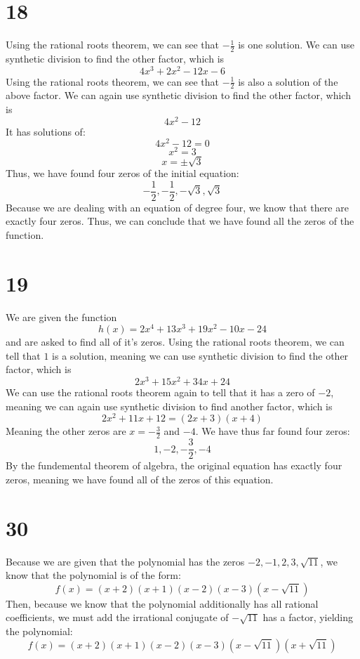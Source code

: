 \documentclass{article}
\theoremstyle{definition}
\begin{document}
\section*{18}


Using the rational roots theorem, we can see that $-\frac{1}{2}$ is one solution. We can use synthetic division to find the other factor, which is 
\[ 4x^3+2x^2-12x-6 \] Using the rational roots theorem, we can see that $-\frac{1}{2}$ is also a solution of the above factor. We can again use synthetic 
division to find the other factor, which is \[ 4x^2-12 \] It has solutions of:
\[ 4x^2-12=0 \]
\[ x^2=3 \]
\[ x=\pm\sqrt{3} \]
Thus, we have found four zeros of the initial equation: \[ -\frac{1}{2},-\frac{1}{2},-\sqrt{3},\sqrt{3} \] Because we are dealing with an equation of degree 
four, we know that there are exactly four zeros. Thus, we can conclude that we have found all the zeros of the function.

\section*{19}


We are given the function \[ h(x)=2x^4+13x^3+19x^2-10x-24 \] and are asked to find all of it's zeros. Using the rational roots theorem, we can tell that 
$1$ is a solution, meaning we can use synthetic division to find the other factor, which is \[ 2x^3+15x^2+34x+24 \] We can use the rational roots 
theorem again to tell that it has a zero of $-2$, meaning we can again use synthetic division to find another factor, which is 
\[ 2x^2+11x+12=(2x+3)(x+4) \] Meaning the other zeros are $x=-\frac{3}{2}$ and $-4$. We have thus far found four zeros: \[ 1,-2,-\frac{3}{2},-4 \]
By the fundemental theorem of algebra, the original equation has exactly four zeros, meaning we have found all of the zeros of this equation. 

\section*{30}


Because we are given that the polynomial has the zeros $-2,-1,2,3,\sqrt{11}$, we know that the polynomial is of the form:
\[ f(x)=(x+2)(x+1)(x-2)(x-3)(x-\sqrt{11}) \]
Then, because we know that the polynomial additionally has all rational coefficients, we must add the irrational conjugate of $-\sqrt{11}$ has a 
factor, yielding the polynomial:
\[ f(x)=(x+2)(x+1)(x-2)(x-3)(x-\sqrt{11})(x+\sqrt{11}) \]
\end{document}
